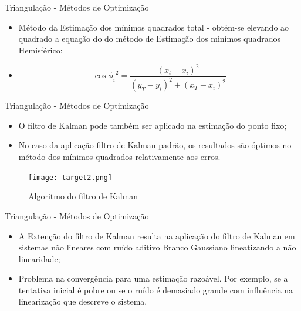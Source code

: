 \documentclass[portuguese,10pt]{beamer}
\begin{document}
\begin{frame}{Triangulação - Métodos de Optimização}
   
    \begin{itemize}
 
        \item Método da Estimação dos mínimos quadrados total - obtém-se elevando ao quadrado a equação do do método de Estimação dos minímos quadrados Hemisférico:
        \vspace{5mm}
        \item \begin{equation*}
    \cos{\phi_i}^2= \frac{(x_t - x_i)^2}{(y_T - y_i)^2+(x_T - x_i)^2}
\end{equation*}
       
    \end{itemize}
  \end{frame} 


\begin{frame}{Triangulação - Métodos de Optimização}
   
    \begin{itemize}
 
        \item O filtro de Kalman pode também ser aplicado na estimação do ponto fixo;
        
        \item No caso da aplicação filtro de Kalman padrão, os resultados são óptimos no método dos mínimos quadrados relativamente aos erros.
    
       
    \end{itemize}
    \begin{figure}[ht]
\centering
\texttt{[image: target2.png]}
\caption{Algoritmo do filtro de Kalman}
\label{target2}
\end{figure}
\end{frame}

\begin{frame}{Triangulação - Métodos de Optimização}
   
    \begin{itemize}
 
        \item A Extenção do filtro de Kalman resulta na aplicação do filtro de Kalman em sistemas não lineares com ruído aditivo Branco Gaussiano lineatizando a não linearidade;
        \vspace*{5mm}
        \item Problema na convergência para uma estimação razoável. Por exemplo, se a tentativa inicial é pobre ou se o ruído é demasiado grande com influência na linearização que descreve o sistema. 
 
       
    \end{itemize}
   
\end{frame}
\end{document}
